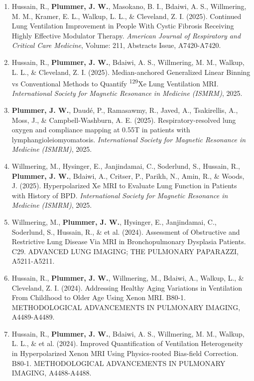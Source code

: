 \documentclass[12pt,]{scrartcl}
\begin{document}
\begin{enumerate}
    \item Hussain, R., \textbf{Plummer, J. W.}, Masokano, B. I., Bdaiwi, A. S., Willmering, M. M., Kramer, E. L., Walkup, L. L., \& Cleveland, Z. I. (2025). Continued Lung Ventilation Improvement in People With Cystic Fibrosis Receiving Highly Effective Modulator Therapy. \textit{American Journal of Respiratory and Critical Care Medicine}, Volume: 211, Abstracts Issue, A7420-A7420.

    \item Hussain, R., \textbf{Plummer, J. W.}, Bdaiwi, A. S., Willmering, M. M., Walkup, L. L., \& Cleveland, Z. I. (2025). Median-anchored Generalized Linear Binning vs Conventional Methods to Quantify \textsuperscript{129}Xe Lung Ventilation MRI. \textit{International Society for Magnetic Resonance in Medicine (ISMRM)}, 2025.

    \item \textbf{Plummer, J. W.}, Daudé, P., Ramasawmy, R., Javed, A., Tsakirellis, A., Moss, J., \& Campbell-Washburn, A. E. (2025). Respiratory-resolved lung oxygen and compliance mapping at 0.55T in patients with lymphangioleiomyomatosis. \textit{International Society for Magnetic Resonance in Medicine (ISMRM)}, 2025.

    \item Willmering, M., Hysinger, E., Janjindamai, C., Soderlund, S., Hussain, R., \textbf{Plummer, J. W.}, Bdaiwi, A., Critser, P., Parikh, N., Amin, R., \& Woods, J. (2025). Hyperpolarized Xe MRI to Evaluate Lung Function in Patients with History of BPD. \textit{International Society for Magnetic Resonance in Medicine (ISMRM)}, 2025.

    


    \item Willmering, M., \textbf{Plummer, J. W.}, Hysinger, E., Janjindamai, C., Soderlund, S., Hussain, R., \& et al. (2024). Assessment of Obstructive and Restrictive Lung Disease Via MRI in Bronchopulmonary Dysplasia Patients. C29. ADVANCED LUNG IMAGING; THE PULMONARY PAPARAZZI, A5211-A5211.

    \item Hussain, R., \textbf{Plummer, J. W.}, Willmering, M., Bdaiwi, A., Walkup, L., \& Cleveland, Z. I. (2024). Addressing Healthy Aging Variations in Ventilation From Childhood to Older Age Using Xenon MRI. B80-1. METHODOLOGICAL ADVANCEMENTS IN PULMONARY IMAGING, A4489-A4489.

    \item Hussain, R., \textbf{Plummer, J. W.}, Bdaiwi, A. S., Willmering, M. M., Walkup, L. L., \& et al. (2024). Improved Quantification of Ventilation Heterogeneity in Hyperpolarized Xenon MRI Using Physics-rooted Bias-field Correction. B80-1. METHODOLOGICAL ADVANCEMENTS IN PULMONARY IMAGING, A4488-A4488.


\end{enumerate}
\end{document}
